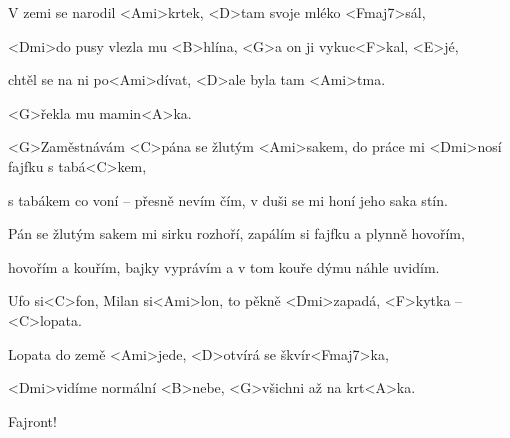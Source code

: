 

\zs
V zemi se narodil <Ami>krtek,
<D>tam svoje mléko <Fmaj7>sál,

<Dmi>do pusy vlezla mu <B>hlína,
<G>a on ji vykuc<F>kal, <E>jé,

chtěl se na ni po<Ami>dívat,
<D>ale byla tam <Ami>tma.

<G>řekla mu mamin<A>ka.

\ks
\zs

<G>Zaměstnávám <C>pána se žlutým <Ami>sakem,
do práce mi <Dmi>nosí fajfku s tabá<C>kem,

s tabákem co voní -- přesně nevím čím,
v duši se mi honí jeho saka stín.

Pán se žlutým sakem mi sirku rozhoří,
zapálím si fajfku a plynně hovořím,

hovořím a kouřím, bajky vyprávím
a v tom kouře dýmu náhle uvidím.

\ks
\zs

Ufo si<C>fon, Milan si<Ami>lon,
to pěkně <Dmi>zapadá, <F>kytka -- <C>lopata.

Lopata do země <Ami>jede,
<D>otvírá se škvír<Fmaj7>ka,

<Dmi>vidíme normální <B>nebe,
<G>všichni až na krt<A>ka.

Fajront!
\ks

\kp
